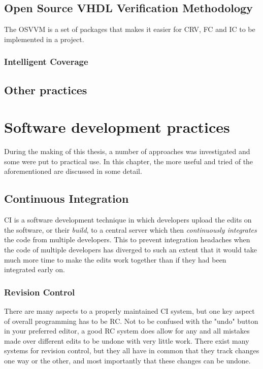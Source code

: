 \documentclass[11pt,british]{article}
\begin{document}
\subsection{Open Source VHDL Verification Methodology}
The \gls{OSVVM} is a set of packages that makes it easier for \gls{CRV}, \gls{FC} and \gls{IC} to be implemented in a project. 

\subsubsection{Intelligent Coverage}


\subsection{Other practices}

\newpage


\section{Software development practices}
During the making of this thesis, a number of approaches was investigated and some were put to practical use. In this chapter, the more useful and tried of the aforementioned are discussed in some detail.

\subsection{Continuous Integration}
\gls{CI} is a software development technique in which developers upload the edits on the software, or their \emph{build}, to a central server which then \emph{continuously integrates} the code from multiple developers. This to prevent integration headaches when the code of multiple developers has diverged to such an extent that it would take much more time to make the edits work together than if they had been integrated early on.

\subsubsection{Revision Control}
There are many aspects to a properly maintained \gls{CI} system, but one key aspect of overall programming has to be \gls{RC}. Not to be confused with the "undo" button in your preferred editor, a good \gls{RC} system does allow for any and all mistakes made over different edits to be undone with very little work. There exist many systems for revision control, but they all have in common that they track changes one way or the other, and most importantly that these changes can be undone. 
\end{document}
